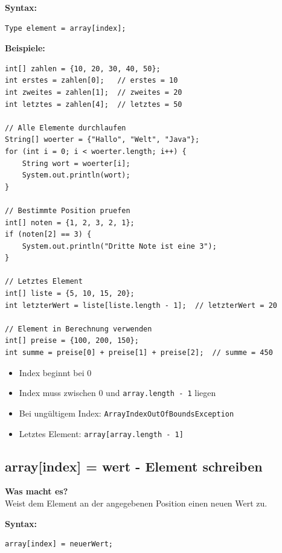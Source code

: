 \textbf{Syntax:}
\begin{lstlisting}
Type element = array[index];
\end{lstlisting}

\textbf{Beispiele:}
\begin{lstlisting}
int[] zahlen = {10, 20, 30, 40, 50};
int erstes = zahlen[0];   // erstes = 10
int zweites = zahlen[1];  // zweites = 20
int letztes = zahlen[4];  // letztes = 50

// Alle Elemente durchlaufen
String[] woerter = {"Hallo", "Welt", "Java"};
for (int i = 0; i < woerter.length; i++) {
    String wort = woerter[i];
    System.out.println(wort);
}

// Bestimmte Position pruefen
int[] noten = {1, 2, 3, 2, 1};
if (noten[2] == 3) {
    System.out.println("Dritte Note ist eine 3");
}

// Letztes Element
int[] liste = {5, 10, 15, 20};
int letzterWert = liste[liste.length - 1];  // letzterWert = 20

// Element in Berechnung verwenden
int[] preise = {100, 200, 150};
int summe = preise[0] + preise[1] + preise[2];  // summe = 450
\end{lstlisting}

\begin{achtung}
	\begin{itemize}
		\item Index beginnt bei 0
		\item Index muss zwischen 0 und \texttt{array.length - 1} liegen
		\item Bei ungültigem Index: \texttt{ArrayIndexOutOfBoundsException}
		\item Letztes Element: \texttt{array[array.length - 1]}
	\end{itemize}
\end{achtung}

\newpage


\subsection*{array[index] = wert - Element schreiben}

\textbf{Was macht es?}\\
Weist dem Element an der angegebenen Position einen neuen Wert zu.

\textbf{Syntax:}
\begin{lstlisting}
array[index] = neuerWert;
\end{lstlisting}

